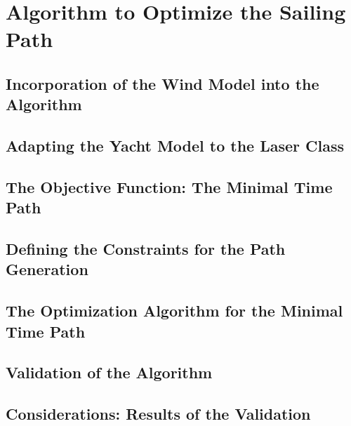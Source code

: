 \chapter{Algorithm to Optimize the Sailing Path}

\section{Incorporation of the Wind Model into the Algorithm}
\section{Adapting the Yacht Model to the Laser Class}
\section{The Objective Function: The Minimal Time Path}
\section{Defining the Constraints for the Path Generation}
\section{The Optimization Algorithm for the Minimal Time Path}
\section{Validation of the Algorithm}
\section{Considerations: Results of the Validation}

%